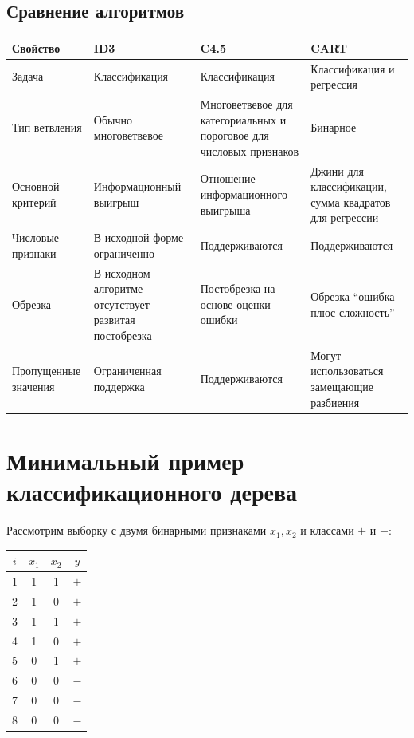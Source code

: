 \documentclass[12pt,a4paper]{article}
\theoremstyle{plain}
\theoremstyle{definition}
\theoremstyle{remark}
\begin{document}
\subsection{Сравнение алгоритмов}

\begin{center}
\small
\begin{tabularx}{\textwidth}{
    >{\raggedright\arraybackslash}p{2.2cm}
    >{\raggedright\arraybackslash}X
    >{\raggedright\arraybackslash}X
    >{\raggedright\arraybackslash}X
}
\toprule
\textbf{Свойство}
&
\textbf{ID3}
&
\textbf{C4.5}
&
\textbf{CART}
\\
\midrule

Задача
&
Классификация
&
Классификация
&
Классификация и регрессия
\\

Тип ветвления
&
Обычно многоветвевое
&
Многоветвевое для категориальных и пороговое для числовых признаков
&
Бинарное
\\

Основной критерий
&
Информационный выигрыш
&
Отношение информационного выигрыша
&
Джини для классификации, сумма квадратов для регрессии
\\

Числовые признаки
&
В исходной форме ограниченно
&
Поддерживаются
&
Поддерживаются
\\

Обрезка
&
В исходном алгоритме отсутствует развитая постобрезка
&
Постобрезка на основе оценки ошибки
&
Обрезка ``ошибка плюс сложность''
\\

Пропущенные значения
&
Ограниченная поддержка
&
Поддерживаются
&
Могут использоваться замещающие разбиения
\\

\bottomrule
\end{tabularx}
\end{center}

\section{Минимальный пример классификационного дерева}

Рассмотрим выборку с двумя бинарными признаками $x_1,x_2$ и классами
$+$ и $-$:

\begin{center}
\begin{tabular}{cccc}
\toprule
$i$ & $x_1$ & $x_2$ & $y$\\
\midrule
1 & 1 & 1 & $+$\\
2 & 1 & 0 & $+$\\
3 & 1 & 1 & $+$\\
4 & 1 & 0 & $+$\\
5 & 0 & 1 & $+$\\
6 & 0 & 0 & $-$\\
7 & 0 & 0 & $-$\\
8 & 0 & 0 & $-$\\
\bottomrule
\end{tabular}
\end{center}
\end{document}
